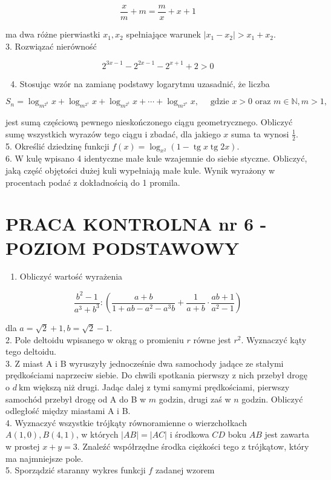 \documentclass[10pt]{article}
\begin{document}
$$
\frac{x}{m}+m=\frac{m}{x}+x+1
$$

ma dwa różne pierwiastki $x_{1}, x_{2}$ spełniające warunek $\left|x_{1}-x_{2}\right|>x_{1}+x_{2}$.\\
3. Rozwiązać nierówność

$$
2^{3 x-1}-2^{2 x-1}-2^{x+1}+2>0
$$

\begin{enumerate}
  \setcounter{enumi}{3}
  \item Stosując wzór na zamianę podstawy logarytmu uzasadnić, że liczba
\end{enumerate}

$$
S_{n}=\log _{m^{2^{0}}} x+\log _{m^{2^{1}}} x+\log _{m^{2^{2}}} x+\cdots+\log _{m^{2^{n}}} x, \quad \text { gdzie } x>0 \text { oraz } m \in \mathbb{N}, m>1,
$$

jest sumą częściową pewnego nieskończonego ciągu geometrycznego. Obliczyć sumę wszystkich wyrazów tego ciągu i zbadać, dla jakiego $x$ suma ta wynosi $\frac{1}{2}$.\\
5. Określić dziedzinę funkcji $f(x)=\log _{x^{2}}(1-\operatorname{tg} x \operatorname{tg} 2 x)$.\\
6. W kulę wpisano 4 identyczne małe kule wzajemnie do siebie styczne. Obliczyć, jaką część objętości dużej kuli wypełniają małe kule. Wynik wyrażony w procentach podać z dokładnością do 1 promila.

\section*{PRACA KONTROLNA nr 6 - POZIOM PODSTAWOWY}
\begin{enumerate}
  \item Obliczyć wartość wyrażenia
\end{enumerate}

$$
\frac{b^{2}-1}{a^{3}+b^{3}}:\left(\frac{a+b}{1+a b-a^{2}-a^{3} b}+\frac{1}{a+b} \cdot \frac{a b+1}{a^{2}-1}\right)
$$

dla $a=\sqrt{2}+1, b=\sqrt{2}-1$.\\
2. Pole deltoidu wpisanego w okrąg o promieniu $r$ równe jest $r^{2}$. Wyznaczyć kąty tego deltoidu.\\
3. Z miast A i B wyruszyły jednocześnie dwa samochody jadące ze stałymi prędkościami naprzeciw siebie. Do chwili spotkania pierwszy z nich przebył drogę o $d \mathrm{~km}$ większą niż drugi. Jadąc dalej z tymi samymi prędkościami, pierwszy samochód przebył drogę od A do B w $m$ godzin, drugi zaś w $n$ godzin. Obliczyć odległość między miastami A i B.\\
4. Wyznaczyć wszystkie trójkąty równoramienne o wierzchołkach $A(1,0), B(4,1)$, w których $|A B|=|A C|$ i środkowa $C D$ boku $A B$ jest zawarta w prostej $x+y=3$. Znaleźć współrzędne środka ciężkości tego z trójkątow, który ma najmniejsze pole.\\
5. Sporządzić staranny wykres funkcji $f$ zadanej wzorem
\end{document}

